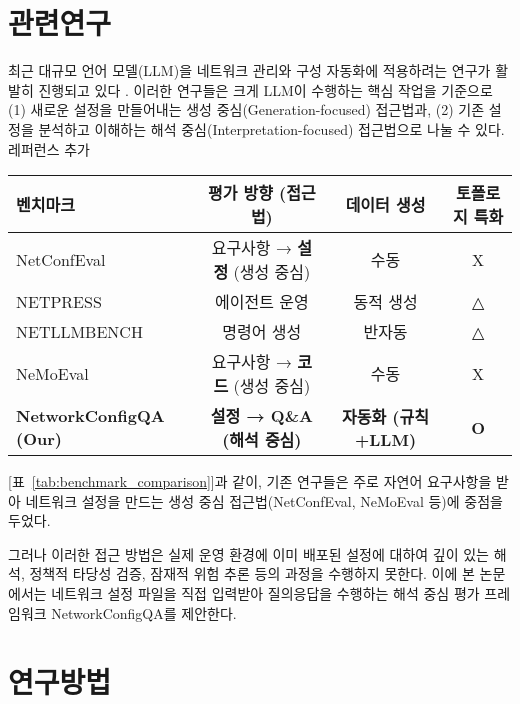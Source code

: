 \documentclass[twocolumn, 10pt]{article}
\begin{document}
\section{관련연구}
최근 대규모 언어 모델(LLM)을 네트워크 관리와 구성 자동화에 적용하려는 연구가 활발히 진행되고 있다 \cite{boateng2025survey}. 이러한 연구들은 크게 LLM이 수행하는 핵심 작업을 기준으로 (1) 새로운 설정을 만들어내는 생성 중심(Generation-focused) 접근법과, (2) 기존 설정을 분석하고 이해하는 해석 중심(Interpretation-focused) 접근법으로 나눌 수 있다. 레퍼런스 추가

\begin{table*}[t]
    \centering
    \caption{LLM 기반 네트워크 관리 벤치마크 비교}
    \label{tab:benchmark_comparison}
    \begin{tabular}{l c c c}
      \toprule
      \textbf{벤치마크} & \textbf{평가 방향 (접근법)} & \textbf{데이터 생성} & \textbf{토폴로지 특화} \\
      \midrule
      NetConfEval & 요구사항 → \textbf{설정} (생성 중심) &  수동 & X \\
      NETPRESS & 에이전트 운영 &  동적 생성 & △ \\
      NETLLMBENCH & 명령어 생성 &  반자동 & △ \\
      NeMoEval & 요구사항 → \textbf{코드} (생성 중심) &  수동 & X \\
      \midrule
      \textbf{NetworkConfigQA (Our)} & \textbf{설정 → Q\&A (해석 중심)} & \textbf{ 자동화 (규칙+LLM)} & \textbf{O} \\
      \bottomrule
    \end{tabular}
\end{table*}

[표~\ref{tab:benchmark_comparison}]과 같이, 기존 연구들은 주로 자연어 요구사항을 받아 네트워크 설정을 만드는 생성 중심 접근법(NetConfEval, NeMoEval 등)에 중점을 두었다.

그러나 이러한 접근 방법은 실제 운영 환경에 이미 배포된 설정에 대하여 깊이 있는 해석, 정책적 타당성 검증, 잠재적 위험 추론 등의 과정을 수행하지 못한다.
이에 본 논문에서는 네트워크 설정 파일을 직접 입력받아 질의응답을 수행하는 해석 중심 평가 프레임워크 NetworkConfigQA를 제안한다.
  \section{연구방법}
\end{document}
